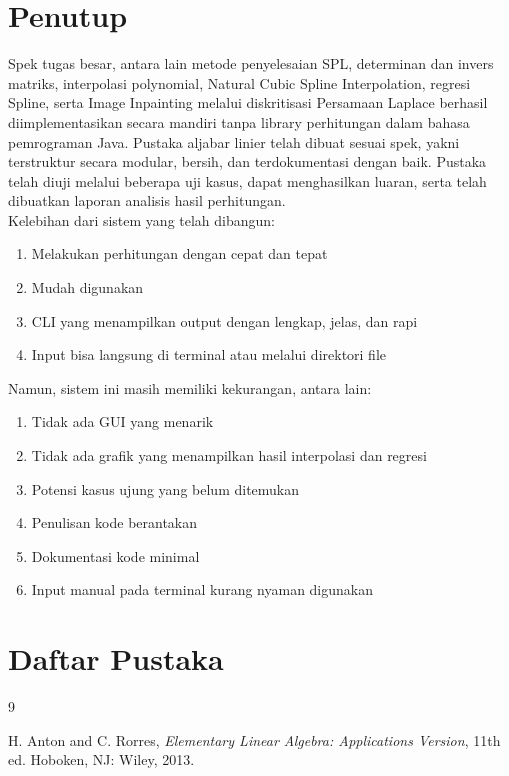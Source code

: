 \documentclass{article}
\begin{document}
\begin{itemize}
\section{Penutup}
Spek tugas besar, antara lain metode penyelesaian SPL, determinan dan invers matriks, interpolasi polynomial, Natural Cubic Spline Interpolation, regresi Spline, serta Image Inpainting melalui diskritisasi Persamaan Laplace berhasil diimplementasikan secara mandiri tanpa library perhitungan dalam bahasa pemrograman Java. Pustaka aljabar linier telah dibuat sesuai spek, yakni terstruktur secara modular, bersih, dan terdokumentasi dengan baik. Pustaka telah diuji melalui beberapa uji kasus, dapat menghasilkan luaran, serta telah dibuatkan laporan analisis hasil perhitungan. \\
Kelebihan dari sistem yang telah dibangun: 
\begin{enumerate}

    \item{Melakukan perhitungan dengan cepat dan tepat}
    \item{Mudah digunakan}
    \item{CLI yang menampilkan output dengan lengkap, jelas, dan rapi}
    \item{Input bisa langsung di terminal atau melalui direktori file}

\end{enumerate}
Namun, sistem ini masih memiliki kekurangan, antara lain:
\begin{enumerate}

    \item{Tidak ada GUI yang menarik}
    \item{Tidak ada grafik yang menampilkan hasil interpolasi dan regresi}
    \item{Potensi kasus ujung yang belum ditemukan}
    \item{Penulisan kode berantakan}
    \item{Dokumentasi kode minimal}
    \item{Input manual pada terminal kurang nyaman digunakan}

\end{enumerate}

\section{Daftar Pustaka}
\begin{thebibliography}{9}

H. Anton and C. Rorres, \textit{Elementary Linear Algebra: Applications Version}, 11th ed. Hoboken, NJ: Wiley, 2013.


\end{thebibliography}
\end{itemize}
\end{document}
